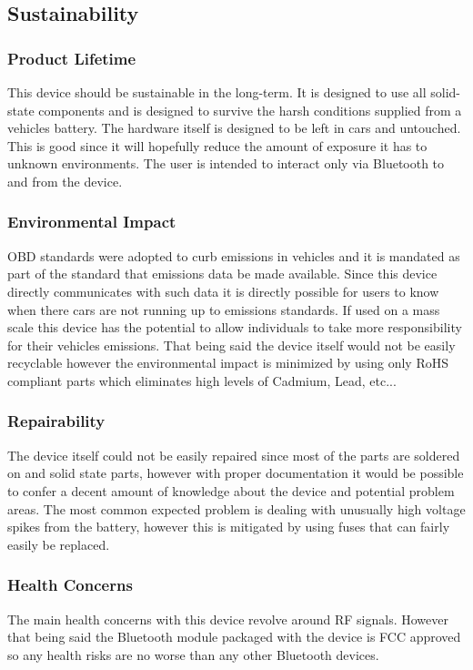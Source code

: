 \documentclass[12pt,letterpaper]{article}
\begin{document}
\subsection{Sustainability}
\subsubsection{Product Lifetime}
This device should be sustainable in the long-term. It is designed to use all solid-state components and is designed to survive the harsh conditions supplied from a vehicles battery. The hardware itself is designed to be left in cars and untouched. This is good since it will hopefully reduce the amount of exposure it has to unknown environments. The user is intended to interact only via Bluetooth to and from the device. 

\subsubsection{Environmental Impact}
OBD standards were adopted to curb emissions in vehicles and it is mandated as part of the standard that emissions data be made available. Since this device directly communicates with such data it is directly possible for users to know when there cars are not running up to emissions standards. If used on a mass scale this device has the potential to allow individuals to take more responsibility for their vehicles emissions. That being said the device itself would not be easily recyclable however the environmental impact is minimized by using only RoHS compliant parts which eliminates high levels of Cadmium, Lead, etc...

\subsubsection{Repairability}
The device itself could not be easily repaired since most of the parts are soldered on and solid state parts, however with proper documentation it would be possible to confer a decent amount of knowledge about the device and potential problem areas. The most common expected problem is dealing with unusually high voltage spikes from the battery, however this is mitigated by using fuses that can fairly easily be replaced.

\subsubsection{Health Concerns}
The main health concerns with this device revolve around RF signals. However that being said the Bluetooth module packaged with the device is FCC approved so any health risks are no worse than any other Bluetooth devices.
\end{document}
